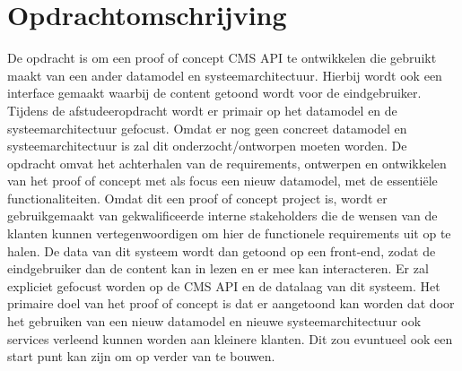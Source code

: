 \section{Opdrachtomschrijving}
De opdracht is om een proof of concept CMS API te ontwikkelen die gebruikt maakt van een ander datamodel en systeemarchitectuur.
Hierbij wordt ook een interface gemaakt waarbij de content getoond wordt voor de eindgebruiker.
Tijdens de afstudeeropdracht wordt er primair op het datamodel en de systeemarchitectuur gefocust.
Omdat er nog geen concreet datamodel en systeemarchitectuur is zal dit onderzocht/ontworpen moeten worden.
\whitespace
De opdracht omvat het achterhalen van de requirements, ontwerpen en ontwikkelen van het proof of
concept met als focus een nieuw datamodel, met de essentiële functionaliteiten. Omdat dit een proof of
concept project is, wordt er gebruikgemaakt van gekwalificeerde interne stakeholders die de wensen van
de klanten kunnen vertegenwoordigen om hier de functionele requirements uit op te halen.
\whitespace
De data van dit systeem wordt dan getoond op een front-end, zodat de eindgebruiker dan de content kan in
lezen en er mee kan interacteren. Er zal expliciet gefocust worden op de CMS API en de datalaag van dit
systeem.
\whitespace
Het primaire doel van het proof of concept is dat er aangetoond kan worden dat door het gebruiken van een nieuw
datamodel en nieuwe systeemarchitectuur ook services verleend kunnen worden aan kleinere klanten.
Dit zou evuntueel ook een start punt kan zijn om op verder van te bouwen.
